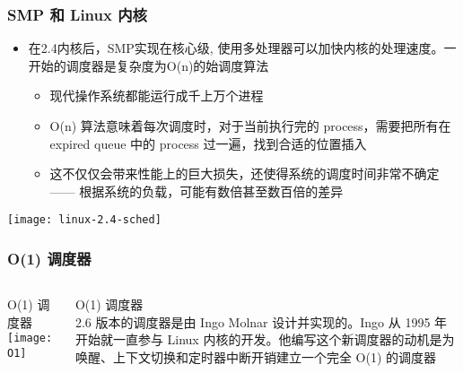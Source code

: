 \begin{frame}
	\frametitle{SMP 和 Linux 内核}
	
	\begin{itemize}
		
		\item 在2.4内核后，SMP实现在核心级, 使用多处理器可以加快内核的处理速度。一开始的调度器是复杂度为O(n)的始调度算法
		
		\begin{itemize}
			\item 现代操作系统都能运行成千上万个进程
			\item O(n) 算法意味着每次调度时，对于当前执行完的 process，需要把所有在 expired queue 中的 process 过一遍，找到合适的位置插入
			\item 这不仅仅会带来性能上的巨大损失，还使得系统的调度时间非常不确定 —— 根据系统的负载，可能有数倍甚至数百倍的差异
		\end{itemize}
	\end{itemize}
	
	\texttt{[image: linux-2.4-sched]}
	
	
\end{frame}
\begin{frame}
	\frametitle{ O(1) 调度器}
	\begin{columns}
		\begin{column}{.5\textwidth}
			\Large \centering
			O(1) 调度器
			\texttt{[image: O1]}
	
		\end{column}
		
		\begin{column}{.5\textwidth}
			\large
			O(1) 调度器 \\
			
2.6 版本的调度器是由 Ingo Molnar 设计并实现的。Ingo 从 1995 年开始就一直参与 Linux 内核的开发。他编写这个新调度器的动机是为唤醒、上下文切换和定时器中断开销建立一个完全 O(1) 的调度器
			
		\end{column}
	\end{columns}
\end{frame}


